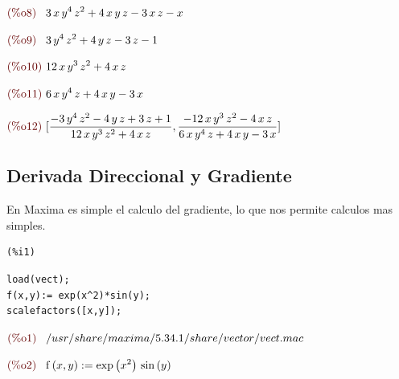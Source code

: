 \documentclass[12pt]{article}
\begin{document}
\begin{math}\displaystyle
\parbox{8ex}{\color{labelcolor}(\%o8) }
3\,x\,{y}^{4}\,{z}^{2}+4\,x\,y\,z-3\,x\,z-x
\end{math}

\begin{math}\displaystyle
\parbox{8ex}{\color{labelcolor}(\%o9) }
3\,{y}^{4}\,{z}^{2}+4\,y\,z-3\,z-1
\end{math}

\begin{math}\displaystyle
\parbox{8ex}{\color{labelcolor}(\%o10) }
12\,x\,{y}^{3}\,{z}^{2}+4\,x\,z
\end{math}

\begin{math}\displaystyle
\parbox{8ex}{\color{labelcolor}(\%o11) }
6\,x\,{y}^{4}\,z+4\,x\,y-3\,x
\end{math}

\begin{math}\displaystyle
\parbox{8ex}{\color{labelcolor}(\%o12) }
[\frac{-3\,{y}^{4}\,{z}^{2}-4\,y\,z+3\,z+1}{12\,x\,{y}^{3}\,{z}^{2}+4\,x\,z},\frac{-12\,x\,{y}^{3}\,{z}^{2}-4\,x\,z}{6\,x\,{y}^{4}\,z+4\,x\,y-3\,x}]
\end{math}
 
 \subsection{Derivada Direccional y Gradiente}
 En Maxima es simple el calculo del gradiente, lo que nos permite calculos mas simples.
 
 \noindent
\begin{minipage}[t]{8ex}{\color{red}\bf
\begin{verbatim}
(%i1) 
\end{verbatim}}
\end{minipage}
\begin{minipage}[t]{\textwidth}{\color{blue}
\begin{verbatim}
load(vect);
f(x,y):= exp(x^2)*sin(y);
scalefactors([x,y]);
\end{verbatim}}
\end{minipage}
\begin{math}\displaystyle
\parbox{8ex}{\color{labelcolor}(\%o1) }
/usr/share/maxima/5.34.1/share/vector/vect.mac
\end{math}

\begin{math}\displaystyle
\parbox{8ex}{\color{labelcolor}(\%o2) }
\mathrm{f}\left( x,y\right) :=\mathrm{exp}\left( {x}^{2}\right) \,\mathrm{sin}\left( y\right) 
\end{math}
\end{document}
